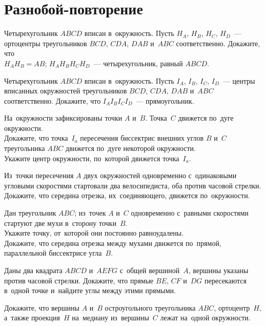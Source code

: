 
\section*{Разнобой-повторение}


\begin{problems}

\item
Четырехугольник $ABCD$ вписан в~окружность.
Пусть $H_A$, $H_B$, $H_C$, $H_D$~--- ортоцентры треугольников
$BCD$, $CDA$, $DAB$ и~$ABC$ соответственно.
Докажите, что
\\
\subproblem $H_A H_B = AB$;
\quad
\subproblem $H_A H_B H_C H_D$~--- четырехугольник, равный $ABCD$.

\item
Четырехугольник $ABCD$ вписан в~окружность.
Пусть $I_A$, $I_B$, $I_C$, $I_D$~---
центры вписанных окружностей треугольников $BCD$, $CDA$, $DAB$ и~$ABC$
соответственно.
Докажите, что $I_A I_B I_C I_D$~--- прямоугольник.

\item
На~окружности зафиксированы точки $A$ и~$B$.
Точка~$C$ движется по~дуге окружности.
\\
\subproblem
Докажите, что точка~$I_a$ пересечения биссектрис внешних углов $B$ и~$C$
треугольника $ABC$ движется по~дуге некоторой окружности.
\\
\subproblem
Укажите центр окружности, по~которой движется точка~$I_a$.

\item
Из~точки пересечения $A$ двух окружностей одновременно с~одинаковыми угловыми
скоростями стартовали два велосипедиста, оба против часовой стрелки.
Докажите, что середина отрезка, их~соединяющего, движется по~окружности.

\item
Дан треугольник $ABC$;
из~точек $A$ и~$C$ одновременно с~равными скоростями стартуют две мухи
в~сторону точки~$B$.
\\
\subproblem
Укажите точку, от~которой они постоянно равноудалены.
\\
\subproblem
Докажите, что середина отрезка между мухами движется по~прямой, параллельной
биссектрисе угла~$B$.

\item
Даны два квадрата $ABCD$ и~$AEFG$ с~общей вершиной~$A$, вершины указаны против
часовой стрелки.
Докажите, что прямые $BE$, $CF$ и~$DG$ пересекаются в~одной точке и~найдите
углы между этими прямыми.

\item
Докажите, что вершины $A$ и~$B$ остроугольного треугольника $ABC$,
ортоцентр~$H$, а~также проекция~$H$ на~медиану из~вершины~$C$ лежат на~одной
окружности.

\end{problems}

